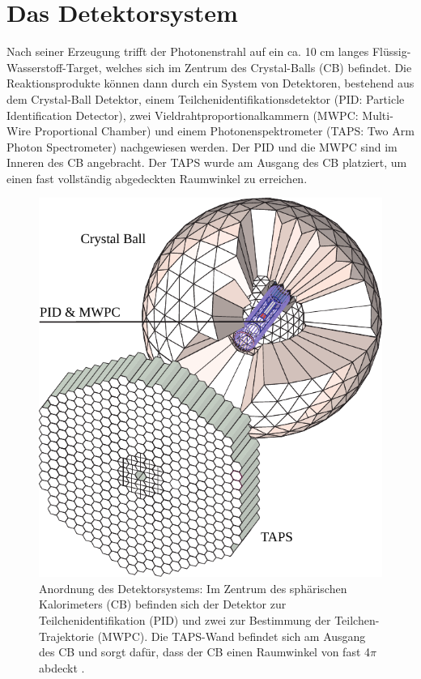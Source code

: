 \documentclass[a4paper,11pt,oneside,final,german,openbib,pdftex]{scrbook}
\begin{document}
{\section{Das Detektorsystem}
\label{sec:Das-Detektorsystem}
Nach seiner Erzeugung trifft der Photonenstrahl auf ein ca. 10 cm langes Flüssig-Wasserstoff-Target, welches sich im Zentrum des Crystal-Balls (CB) befindet. Die Reaktionsprodukte können dann durch ein System von Detektoren, bestehend aus dem Crystal-Ball Detektor, einem Teilchenidentifikationsdetektor (PID: Particle Identification Detector), zwei Vieldrahtproportionalkammern (MWPC: Multi-Wire Proportional Chamber) und einem Photonenspektrometer (TAPS: Two Arm  Photon Spectrometer) nachgewiesen werden. Der PID und die MWPC sind im Inneren des CB angebracht. Der TAPS wurde am Ausgang des CB platziert, um einen fast vollständig abgedeckten Raumwinkel zu erreichen.
\begin{figure}[h!]
	\begin{center}
		\includegraphics{crystal_ball}
	
		\caption[Anordnung des Detektorsystems] {Anordnung des Detektorsystems: Im Zentrum des sph\"arischen Kalorimeters (CB) befinden sich der Detektor zur Teilchenidentifikation (PID) und zwei zur Bestimmung der Teilchen-Trajektorie (MWPC). Die TAPS-Wand befindet sich am Ausgang des CB und sorgt daf\"ur, dass der CB einen Raumwinkel von fast 4$\pi$ abdeckt \cite{We13}.}
		\label{[fig.crystal_ball]}	
\end{center}
\end{figure}

}
\end{document}
